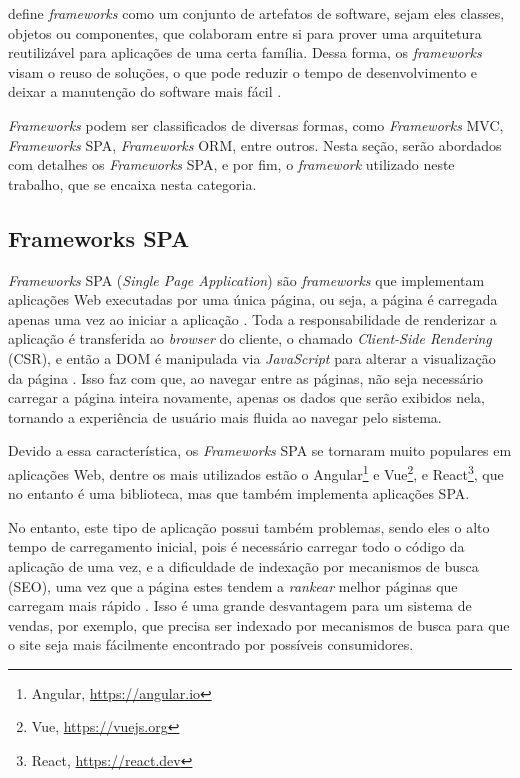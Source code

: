  define \textit{frameworks} como um conjunto de artefatos de software, sejam eles
classes, objetos ou componentes, que colaboram entre si para prover uma arquitetura reutilizável
para aplicações de uma certa família. Dessa forma, os \textit{frameworks} visam o reuso de soluções, o que
pode reduzir o tempo de desenvolvimento e deixar a manutenção do software mais fácil \cite{gamma:2000}.

\textit{Frameworks} podem ser classificados de diversas formas, como \textit{Frameworks} MVC,
\textit{Frameworks} SPA, \textit{Frameworks} ORM, entre outros. Nesta seção, serão abordados
com detalhes os \textit{Frameworks} SPA, e por fim, o \textit{framework} utilizado neste trabalho,
que se encaixa nesta categoria.

\subsection{Frameworks SPA}
\label{sec-fundteo-framework-spa}

\textit{Frameworks} SPA (\textit{Single Page Application}) são \textit{frameworks} que implementam
aplicações Web executadas por uma única página, ou seja, a página é carregada apenas uma vez 
ao iniciar a aplicação \cite{emmitt:2015}. Toda a responsabilidade de renderizar a aplicação é
transferida ao \textit{browser} do cliente, o chamado \textit{Client-Side Rendering} (CSR),
e então a DOM é manipulada via \textit{JavaScript} para alterar a visualização da 
página \cite{emmitt:2015,konshin:2018}. Isso faz com que, ao navegar entre as páginas, não 
seja necessário carregar a página inteira novamente, apenas os dados que serão exibidos nela, 
tornando a experiência de usuário mais fluida ao navegar pelo sistema. 

Devido a essa característica, os \textit{Frameworks} SPA se tornaram muito populares em aplicações
Web, dentre os mais utilizados estão o Angular\footnote{Angular, \url{https://angular.io}}
e Vue\footnote{Vue, \url{https://vuejs.org}}, e React\footnote{React, \url{https://react.dev}}, 
que no entanto é uma biblioteca, mas que também implementa aplicações SPA.

No entanto, este tipo de aplicação possui também problemas, sendo eles o alto tempo de carregamento
inicial, pois é necessário carregar todo o código da aplicação de uma vez, e a dificuldade de
indexação por mecanismos de busca (SEO), uma vez que a página estes tendem a \textit{rankear} melhor
páginas que carregam mais rápido \cite{konshin:2018}. Isso é uma grande desvantagem para um sistema
de vendas, por exemplo, que precisa ser indexado por mecanismos de busca para que o site seja mais
fácilmente encontrado por possíveis consumidores.


